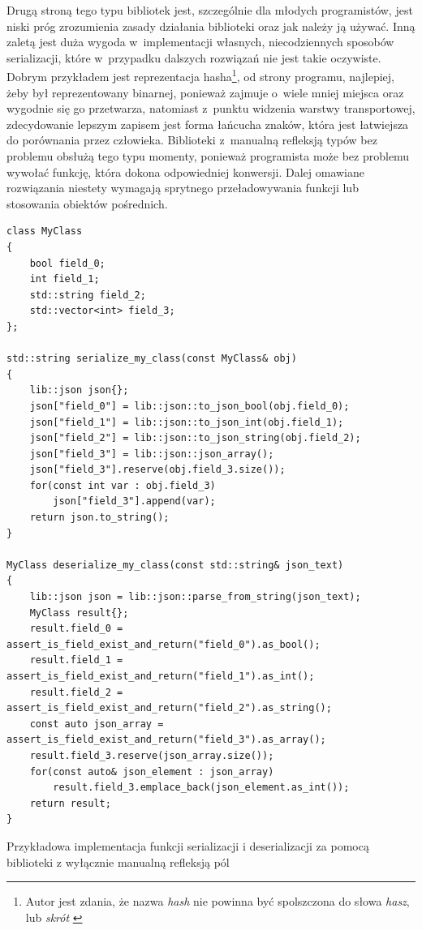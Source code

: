 \documentclass[12pt]{article}
\newcommand{\nonpl}[1]{{\it #1}}
\begin{document}
{{{				Drugą stroną tego typu bibliotek jest, szczególnie dla młodych programistów, jest niski próg zrozumienia zasady działania
				biblioteki oraz jak należy ją używać. Inną zaletą jest duża wygoda w~implementacji własnych, niecodziennych sposobów serializacji,
				które w~przypadku dalszych rozwiązań nie jest takie oczywiste. Dobrym przykładem jest reprezentacja hasha\footnote{
					Autor jest zdania, że nazwa \nonpl{hash} nie powinna być spolszczona do słowa \nonpl{hasz}, lub \nonpl{skrót} \cite{hash_po_angielskiemu}
				}, od strony programu, najlepiej, żeby był reprezentowany binarnej, ponieważ zajmuje o~wiele mniej miejsca oraz wygodnie się go przetwarza,
				natomiast z~punktu widzenia warstwy transportowej, zdecydowanie lepszym zapisem jest forma łańcucha znaków, która jest łatwiejsza do porównania
				przez człowieka. Biblioteki z~manualną refleksją typów bez problemu obsłużą tego typu momenty, ponieważ programista może bez problemu
				wywołać funkcję, która dokona odpowiedniej konwersji. Dalej omawiane rozwiązania niestety wymagają sprytnego przeładowywania funkcji lub
				stosowania obiektów pośrednich.

				\begin{captioned}[H]
					\begin{lstlisting}[frame=single]
class MyClass
{
	bool field_0;
	int field_1;
	std::string field_2;
	std::vector<int> field_3;
};

std::string serialize_my_class(const MyClass& obj)
{
	lib::json json{};
	json["field_0"] = lib::json::to_json_bool(obj.field_0);
	json["field_1"] = lib::json::to_json_int(obj.field_1);
	json["field_2"] = lib::json::to_json_string(obj.field_2);
	json["field_3"] = lib::json::json_array();
	json["field_3"].reserve(obj.field_3.size());
	for(const int var : obj.field_3)
		json["field_3"].append(var);
	return json.to_string();
}

MyClass deserialize_my_class(const std::string& json_text)
{
	lib::json json = lib::json::parse_from_string(json_text);
	MyClass result{};
	result.field_0 = assert_is_field_exist_and_return("field_0").as_bool();
	result.field_1 = assert_is_field_exist_and_return("field_1").as_int();
	result.field_2 = assert_is_field_exist_and_return("field_2").as_string();
	const auto json_array = assert_is_field_exist_and_return("field_3").as_array();
	result.field_3.reserve(json_array.size());
	for(const auto& json_element : json_array)
		result.field_3.emplace_back(json_element.as_int());
	return result;
}
					\end{lstlisting}
					\caption{ Przykładowa implementacja funkcji serializacji i deserializacji za pomocą biblioteki z wyłącznie manualną refleksją pól}
					\label{manual_reflection_example}
				\end{captioned}
			}
		}

}
\end{document}
